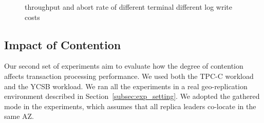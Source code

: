 \documentclass[conference]{IEEEtran}
\begin{document}
\begin{figure}[tbp]
  \centering
  

\caption{throughput and abort rate of
different terminal different log write costs}
\label{fig:new_order_add_log_cost}
\end{figure}


\subsection{Impact of Contention}

Our second set of experiments aim to evaluate how the degree of contention affects transaction processing performance.
We used both the TPC-C workload and the YCSB workload.
We ran all the experiments in a real geo-replication environment described in Section~\ref{subsec:exp_setting}.
We adopted the gathered mode in the experiments, which assumes that all replica leaders co-locate in the same AZ. 
\end{document}
